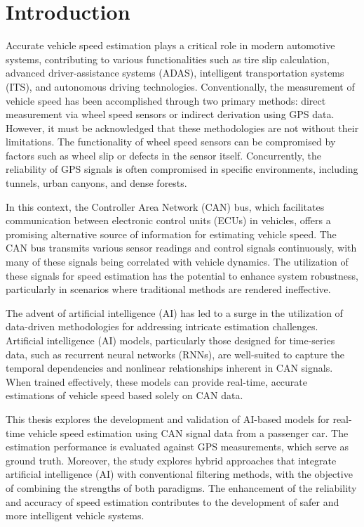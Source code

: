 \chapter*{Introduction}

Accurate vehicle speed estimation plays a critical role in modern automotive systems, contributing to various functionalities such as tire slip calculation, advanced driver-assistance systems (ADAS), intelligent transportation systems (ITS), and autonomous driving technologies. Conventionally, the measurement of vehicle speed has been accomplished through two primary methods: direct measurement via wheel speed sensors or indirect derivation using GPS data. However, it must be acknowledged that these methodologies are not without their limitations. The functionality of wheel speed sensors can be compromised by factors such as wheel slip or defects in the sensor itself. Concurrently, the reliability of GPS signals is often compromised in specific environments, including tunnels, urban canyons, and dense forests.

In this context, the Controller Area Network (CAN) bus, which facilitates communication between electronic control units (ECUs) in vehicles, offers a promising alternative source of information for estimating vehicle speed. The CAN bus transmits various sensor readings and control signals continuously, with many of these signals being correlated with vehicle dynamics. The utilization of these signals for speed estimation has the potential to enhance system robustness, particularly in scenarios where traditional methods are rendered ineffective.

The advent of artificial intelligence (AI) has led to a surge in the utilization of data-driven methodologies for addressing intricate estimation challenges. Artificial intelligence (AI) models, particularly those designed for time-series data, such as recurrent neural networks (RNNs), are well-suited to capture the temporal dependencies and nonlinear relationships inherent in CAN signals. When trained effectively, these models can provide real-time, accurate estimations of vehicle speed based solely on CAN data.

This thesis explores the development and validation of AI-based models for real-time vehicle speed estimation using CAN signal data from a passenger car. The estimation performance is evaluated against GPS measurements, which serve as ground truth. Moreover, the study explores hybrid approaches that integrate artificial intelligence (AI) with conventional filtering methods, with the objective of combining the strengths of both paradigms. The enhancement of the reliability and accuracy of speed estimation contributes to the development of safer and more intelligent vehicle systems.


